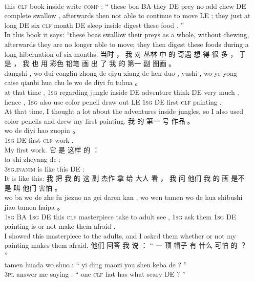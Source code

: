 \documentclass[UTF8]{ctexart}
\begin{document}
\begin{exe}
\\
this \textsc{clf} book inside write \textsc{comp} : `` these boa BA they DE prey no add chew DE complete swallow , afterwards then not {able to} {continue to} move LE ; they just at long DE six \textsc{clf} month DE sleep inside digest these food . ''
\\
\trans In this book it says: ``these boas swallow their preys as a whole, without chewing, afterwards they are no longer able to move; they then digest these foods during a long hibernation of six months. 
\ex
\glll
当时 ， 我 对 丛林 中 的 奇遇 想 得 很 多 ， 于是 ， 我 也 用 彩色 铅笔 画 出 了 我 的 第一 副 图画 。 
\\
dangshi , wo dui conglin zhong de qiyu xiang de hen duo , yushi , wo ye yong caise qianbi hua chu le wo de diyi fu tuhua 。
\\
{at that time} , \textsc{1sg} regarding jungle inside DE adventure think DE very much , hence , \textsc{1sg} also use color pencil draw out LE \textsc{1sg} DE first \textsc{clf} painting .
\\
\trans At that time, I thought a lot about the adventures inside jungles, so I also used color pencils and drew my first painting. 
\ex
\glll
我 的 第一 号 作品 。 
\\
wo de diyi hao zuopin 。 
\\
\textsc{1sg} DE first \textsc{clf} work .
\\
\trans My first work. 
\ex
\glll
它 是 这样 的 ：
\\
ta shi zheyang de : 
\\
\textsc{3sg.inanim} is {like this} DE :
\\
\trans It is like this:
\ex
\glll
我 把 我 的 这 副 杰作 拿 给 大人 看 ， 我 问 他们 我 的 画 是不是 叫 他们 害怕 。
\\
wo ba wo de zhe fu jiezuo na gei daren kan , wo wen tamen wo de hua shibushi jiao tamen haipa 。
\\
\textsc{1sg} BA \textsc{1sg} DE this \textsc{clf} masterpiece take to adult see , \textsc{1sg} ask them \textsc{1sg} DE painting {is or not} make them afraid .
\\
\trans I showed this masterpiece to the adults, and I asked them whether or not my painting makes them afraid.
\ex
\glll
他们 回答 我 说 ： “ 一 顶 帽子 有 什么 可怕 的 ？ ”
\\
tamen huada wo shuo : `` yi ding maozi you shen keba de ? ''
\\
\textsc{3pl} answer me saying : `` one \textsc{clf} hat has what scary DE ? ''

\end{exe}
\end{document}
